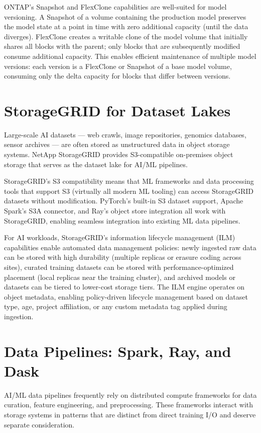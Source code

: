 ONTAP's Snapshot and FlexClone capabilities are well-suited for model versioning. A Snapshot of a volume containing the production model preserves the model state at a point in time with zero additional capacity (until the data diverges). FlexClone creates a writable clone of the model volume that initially shares all blocks with the parent; only blocks that are subsequently modified consume additional capacity. This enables efficient maintenance of multiple model versions: each version is a FlexClone or Snapshot of a base model volume, consuming only the delta capacity for blocks that differ between versions.

\section{StorageGRID for Dataset Lakes}

Large-scale AI datasets --- web crawls, image repositories, genomics databases, sensor archives --- are often stored as unstructured data in object storage systems. NetApp StorageGRID provides S3-compatible on-premises object storage that serves as the dataset lake for AI/ML pipelines.

StorageGRID's S3 compatibility means that ML frameworks and data processing tools that support S3 (virtually all modern ML tooling) can access StorageGRID datasets without modification. PyTorch's built-in S3 dataset support, Apache Spark's S3A connector, and Ray's object store integration all work with StorageGRID, enabling seamless integration into existing ML data pipelines.

For AI workloads, StorageGRID's information lifecycle management (ILM) capabilities enable automated data management policies: newly ingested raw data can be stored with high durability (multiple replicas or erasure coding across sites), curated training datasets can be stored with performance-optimized placement (local replicas near the training cluster), and archived models or datasets can be tiered to lower-cost storage tiers. The ILM engine operates on object metadata, enabling policy-driven lifecycle management based on dataset type, age, project affiliation, or any custom metadata tag applied during ingestion.

\section{Data Pipelines: Spark, Ray, and Dask}

AI/ML data pipelines frequently rely on distributed compute frameworks for data curation, feature engineering, and preprocessing. These frameworks interact with storage systems in patterns that are distinct from direct training I/O and deserve separate consideration.

